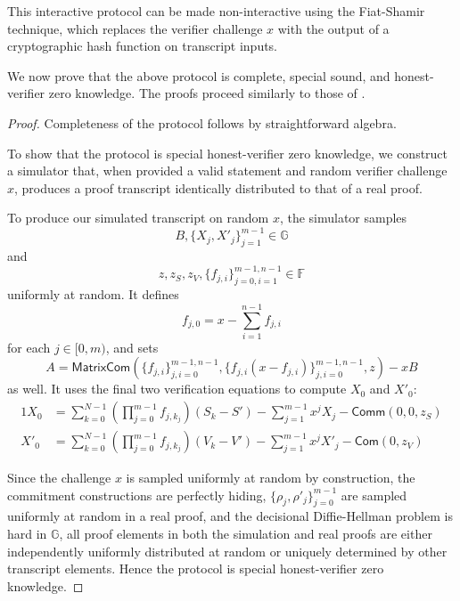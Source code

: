 \documentclass{llncs}
\newcommand{\G}{\mathbb{G}}
\newcommand{\F}{\mathbb{F}}
\newcommand{\func}[1]{\mathsf{#1}}
\newcommand{\com}{\func{Com}}
\newcommand{\comm}{\func{Comm}}
\begin{document}
This interactive protocol can be made non-interactive using the Fiat-Shamir technique, which replaces the verifier challenge $x$ with the output of a cryptographic hash function on transcript inputs.

We now prove that the above protocol is complete, special sound, and honest-verifier zero knowledge.
The proofs proceed similarly to those of \cite{bootle,lelantus,triptych}.

\begin{proof}
    Completeness of the protocol follows by straightforward algebra.

    To show that the protocol is special honest-verifier zero knowledge, we construct a simulator that, when provided a valid statement and random verifier challenge $x$, produces a proof transcript identically distributed to that of a real proof.

    To produce our simulated transcript on random $x$, the simulator samples $$B,\{X_j,X'_j\}_{j=1}^{m-1} \in \G$$ and $$z,z_S,z_V,\{f_{j,i}\}_{j=0,i=1}^{m-1,n-1} \in \F$$ uniformly at random.
    It defines
    $$f_{j,0} = x - \sum_{i=1}^{n-1} f_{j,i}$$
    for each $j \in [0,m)$, and sets
    $$A = \func{MatrixCom}\left(\lbrace f_{j,i} \rbrace_{j,i=0}^{m-1,n-1}, \lbrace f_{j,i}(x - f_{j,i})\rbrace_{j,i=0}^{m-1,n-1}, z\right) - xB$$
    as well.
    It uses the final two verification equations to compute $X_0$ and $X'_0$:
    \begin{alignat*}{1}
        X_0 &= \sum_{k=0}^{N-1} \left(\prod_{j=0}^{m-1} f_{j,k_j}\right)(S_k - S') - \sum_{j=1}^{m-1} x^j X_j - \comm(0, 0, z_S) \\
        X'_0 &= \sum_{k=0}^{N-1} \left(\prod_{j=0}^{m-1} f_{j,k_j}\right)(V_k - V') - \sum_{j=1}^{m-1} x^j X'_j - \com(0, z_V)
    \end{alignat*}

    Since the challenge $x$ is sampled uniformly at random by construction, the commitment constructions are perfectly hiding, $\{\rho_j,\rho'_j\}_{j=0}^{m-1}$ are sampled uniformly at random in a real proof, and the decisional Diffie-Hellman problem is hard in $\G$, all proof elements in both the simulation and real proofs are either independently uniformly distributed at random or uniquely determined by other transcript elements.
    Hence the protocol is special honest-verifier zero knowledge.


\end{proof}
\end{document}
